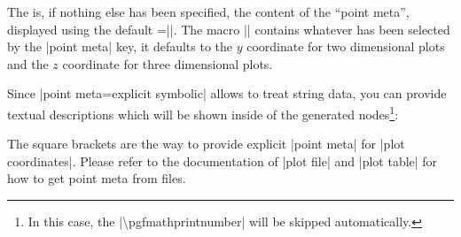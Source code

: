 {\begin{pgfplotskeylist}
\begin{codeexample}[]
\end{codeexample}
	The  is, if nothing else has been specified, the content of the ``point meta'', displayed using the default =|\pgfmathprintnumber{\pgfplotspointmeta}|. The macro |\pgfplotspointmeta| contains whatever has been selected by the |point meta| key, it defaults to the $y$ coordinate for two dimensional plots and the $z$ coordinate for three dimensional plots.

	Since |point meta=explicit symbolic| allows to treat string data, you can provide textual descriptions which will be shown inside of the generated nodes\footnote{In this case, the |\textbackslash pgfmathprintnumber| will be skipped automatically.}:\label{pgfplots:example:pointmeta:nodesnearcoords}

\begin{codeexample}[]
\end{codeexample}
	The square brackets are the way to provide explicit |point meta| for |plot coordinates|. Please refer to the documentation of |plot file| and |plot table| for how to get point meta from files.


\end{pgfplotskeylist}}
